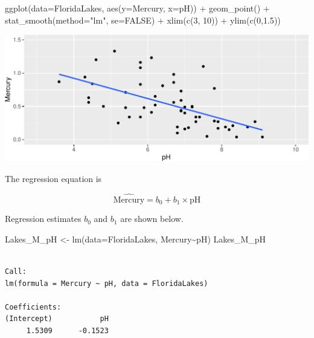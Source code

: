 \documentclass[
  letterpaper,
  DIV=11,
  numbers=noendperiod]{scrreprt}
\newenvironment{Shaded}{\begin{snugshade}}{\end{snugshade}}
\newcommand{\AttributeTok}[1]{\textcolor[rgb]{0.40,0.45,0.13}{#1}}
\newcommand{\ConstantTok}[1]{\textcolor[rgb]{0.56,0.35,0.01}{#1}}
\newcommand{\DecValTok}[1]{\textcolor[rgb]{0.68,0.00,0.00}{#1}}
\newcommand{\FloatTok}[1]{\textcolor[rgb]{0.68,0.00,0.00}{#1}}
\newcommand{\FunctionTok}[1]{\textcolor[rgb]{0.28,0.35,0.67}{#1}}
\newcommand{\NormalTok}[1]{\textcolor[rgb]{0.00,0.23,0.31}{#1}}
\newcommand{\OtherTok}[1]{\textcolor[rgb]{0.00,0.23,0.31}{#1}}
\newcommand{\SpecialCharTok}[1]{\textcolor[rgb]{0.37,0.37,0.37}{#1}}
\newcommand{\StringTok}[1]{\textcolor[rgb]{0.13,0.47,0.30}{#1}}
\begin{document}
\begin{Shaded}
\begin{Highlighting}[]
\FunctionTok{ggplot}\NormalTok{(}\AttributeTok{data=}\NormalTok{FloridaLakes, }\FunctionTok{aes}\NormalTok{(}\AttributeTok{y=}\NormalTok{Mercury, }\AttributeTok{x=}\NormalTok{pH)) }\SpecialCharTok{+} 
  \FunctionTok{geom\_point}\NormalTok{() }\SpecialCharTok{+} \FunctionTok{stat\_smooth}\NormalTok{(}\AttributeTok{method=}\StringTok{"lm"}\NormalTok{, }\AttributeTok{se=}\ConstantTok{FALSE}\NormalTok{) }\SpecialCharTok{+} 
  \FunctionTok{xlim}\NormalTok{(}\FunctionTok{c}\NormalTok{(}\DecValTok{3}\NormalTok{, }\DecValTok{10}\NormalTok{)) }\SpecialCharTok{+} \FunctionTok{ylim}\NormalTok{(}\FunctionTok{c}\NormalTok{(}\DecValTok{0}\NormalTok{,}\FloatTok{1.5}\NormalTok{))}
\end{Highlighting}
\end{Shaded}

\includegraphics{Ch3_files/figure-pdf/unnamed-chunk-211-1.pdf}

The regression equation is

\[
\widehat{\text{Mercury}} = b_0 + b_1\times\text{pH}
\]

Regression estimates \(b_0\) and \(b_1\) are shown below.

\begin{Shaded}
\begin{Highlighting}[]
\NormalTok{Lakes\_M\_pH }\OtherTok{\textless{}{-}} \FunctionTok{lm}\NormalTok{(}\AttributeTok{data=}\NormalTok{FloridaLakes, Mercury}\SpecialCharTok{\textasciitilde{}}\NormalTok{pH)}
\NormalTok{Lakes\_M\_pH}
\end{Highlighting}
\end{Shaded}

\begin{verbatim}

Call:
lm(formula = Mercury ~ pH, data = FloridaLakes)

Coefficients:
(Intercept)           pH  
     1.5309      -0.1523  
\end{verbatim}
\end{document}

